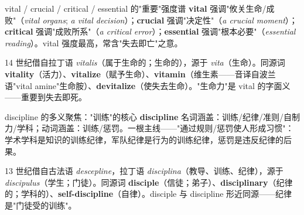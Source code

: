 \documentclass[../main.tex]{subfiles}
\begin{document}
\begin{lex}{vital / crucial / critical / essential 的"重要"强度谱}
\textbf{vital} 强调"攸关生命/成败"（\textit{vital organs}; \textit{a vital decision}）；\textbf{crucial} 强调"决定性"（\textit{a crucial moment}）；\textbf{critical} 强调"成败所系"（\textit{a critical error}）；\textbf{essential} 强调"根本必要"（\textit{essential reading}）。vital 强度最高，常含"失去即亡"之意。
\end{lex}

\begin{origin}
14 世纪借自拉丁语 \textit{vitalis}（属于生命的；生命的），源于 \textit{vita}（生命）。同源词 \textbf{vitality}（活力）、\textbf{vitalize}（赋予生命）、\textbf{vitamin}（维生素——音译自波兰语"vital amine"生命胺）、\textbf{devitalize}（使失去生命）。"生命力"是 vital 的字面义——重要到失去即死。
\end{origin}








\begin{gram}{discipline 的多义聚焦："训练"的核心}
\textbf{discipline} 名词涵盖：训练/纪律/准则/自制力/学科；动词涵盖：训练/惩罚。一根主线——"通过规则/惩罚使人形成习惯"：学术学科是知识的训练纪律，军队纪律是行为的训练纪律，惩罚是违反纪律的后果。
\end{gram}

\begin{origin}
13 世纪借自古法语 \textit{descepline}，拉丁语 \textit{disciplina}（教导、训练、纪律），源于 \textit{discipulus}（学生；门徒）。同源词 \textbf{disciple}（信徒；弟子）、\textbf{disciplinary}（纪律的；学科的）、\textbf{self-discipline}（自律）。disciple 与 discipline 形近同源——纪律是"门徒受的训练"。
\end{origin}
\end{document}
